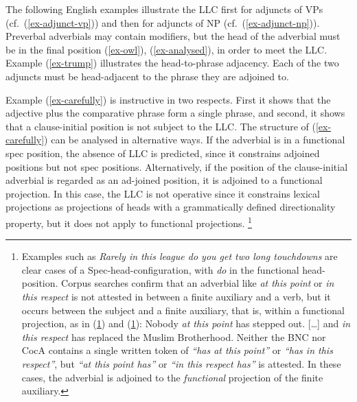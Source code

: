 \documentclass[output=paper
  ,nobabel
  ,uniformtopskip %
]{langscibook}
\begin{document}
The following English examples illustrate the LLC first for adjuncts of VPs (cf.\ (\ref{ex-adjunct-vp}))  and then for adjuncts of NP (cf.\ (\ref{ex-adjunct-np})). Preverbal adverbials may contain modifiers, but the head of the adverbial must be in the final position (\ref{ex-owl}), (\ref{ex-analysed}), in order to meet the LLC. Example (\ref{ex-trump}) illustrates the head-to-phrase adjacency. Each of the two adjuncts must be head-adjacent to the phrase they are adjoined to.
\eal\label{ex-adjunct-vp}
\label{ex-owl}
\label{ex-analysed}
\label{ex-trump}
\label{ex-finch}
\label{ex-carefully}
\label{ex-morecare}
\zl


\noindent
Example (\ref{ex-carefully}) is instructive in two respects. First it shows that the adjective plus the comparative phrase form a single phrase, and second, it shows that a clause-initial position is not subject to the LLC. The structure of (\ref{ex-carefully}) can be analysed in alternative ways. If the adverbial is in a functional spec position, the absence of LLC is predicted, since it constrains adjoined positions but not spec positions. Alternatively, if the position of the clause-initial adverbial is regarded as an ad-joined position, it is adjoined to a functional projection. In this case, the LLC is not operative since it constrains lexical projections as projections of heads with a grammatically defined directionality property, but it does not apply to functional projections.%
%
\footnote{Examples such as \emph{Rarely in this league do you get two long touchdowns} are clear cases of a Spec-head-configuration, with \emph{do} in the functional head-position. Corpus searches confirm that an adverbial like \emph{at this point} or \emph{in this respect} is not attested in between a finite auxiliary and a verb, but it occurs between the subject and a finite auxiliary, that is, within a functional projection, as in (\ref{ex-nobody}) and (\ref{ex-and}):
    \ea
    \label{ex-nobody} Nobody \emph{at this point} has stepped out.
    \z
    \ea\label{ex-and} [\ldots] and \emph{in this respect} has replaced the Muslim Brotherhood.
    \z
Neither the BNC nor CocA contains a single written token of \emph{``has  at this point''} or \emph{``has in this respect''}, but \emph{``at this point has''} or \emph{``in this respect has''} is attested. In these cases, the adverbial is adjoined to the \emph{functional} projection of the finite auxiliary.}
\end{document}
